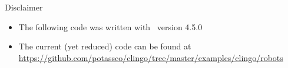 \begin{frame}{Disclaimer}
  \bigskip
  \begin{itemize}
  \item The following code was written with \clingo\ version 4.5.0
  \item The current (yet reduced) code can be found at
    \url{https://github.com/potassco/clingo/tree/master/examples/clingo/robots}
  \end{itemize}
\end{frame}
%
